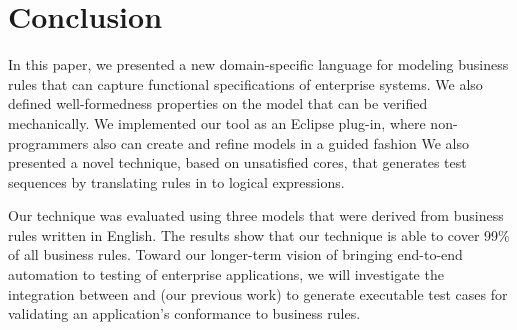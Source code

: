 \section{Conclusion}

In this paper, we presented a new domain-specific language for modeling business
rules that can capture functional specifications of enterprise
systems. We also defined well-formedness properties on the model that can be verified
mechanically. We implemented our tool as an Eclipse plug-in, where
non-programmers also can create and refine models in a guided fashion
We also presented a novel technique, based on unsatisfied cores, that generates test sequences
by translating rules in to logical expressions.


Our technique was evaluated using three models that were derived from business rules written
in English. The results show that our technique
is able to cover 99\% of all business rules. Toward our longer-term
vision of bringing end-to-end automation to testing of enterprise
applications, we will investigate the integration between \tool{} and
\wateg{} (our previous work) to generate executable test cases for validating an
application's conformance to business rules.

